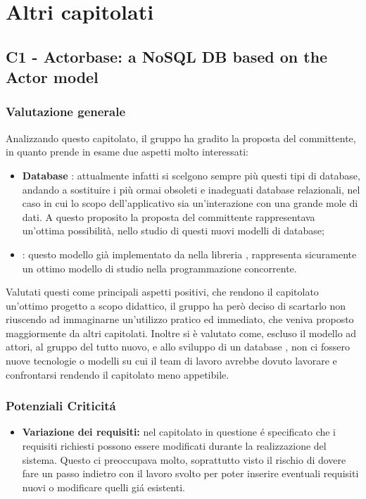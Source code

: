\section{Altri capitolati}

\subsection{C1 - Actorbase: a NoSQL DB based on the Actor model}
\subsubsection{Valutazione generale}
Analizzando questo capitolato, il gruppo ha gradito la proposta del committente, in quanto prende in esame due aspetti molto interessati:
\begin{itemize}
	\item \textbf{Database }: attualmente infatti si scelgono sempre pi\`u questi tipi di database, andando a sostituire i pi\`u ormai obsoleti e inadeguati database relazionali, nel caso in cui lo scopo dell'applicativo sia un'interazione con una grande mole di dati.
	A questo proposito la proposta del committente rappresentava un'ottima possibilit\`a, nello studio di questi nuovi modelli di database;
	\item \textbf{}: questo modello gi\`a implementato da nella libreria , rappresenta sicuramente un ottimo modello di studio nella programmazione concorrente.
\end{itemize}
Valutati questi come principali aspetti positivi, che rendono il capitolato un'ottimo progetto a scopo didattico, il gruppo ha per\`o deciso di scartarlo non riuscendo ad immaginarne un'utilizzo pratico ed immediato, che veniva proposto maggiormente da altri capitolati.
Inoltre si \`e valutato come, escluso il modello ad attori, al gruppo del tutto nuovo, e allo sviluppo di un database , non ci fossero nuove tecnologie o modelli su cui il team di lavoro avrebbe dovuto lavorare e confrontarsi rendendo il capitolato meno appetibile.  

\subsubsection{Potenziali Criticit\'a}

\begin{itemize}
	\item \textbf{Variazione dei requisiti:} nel capitolato in questione \'e specificato che i requisiti richiesti possono essere modificati durante la realizzazione del sistema. Questo ci preoccupava molto, soprattutto visto il rischio di dovere fare un passo indietro con il lavoro svolto per poter inserire eventuali requisiti nuovi o modificare quelli gi\'a esistenti.
\end{itemize}

